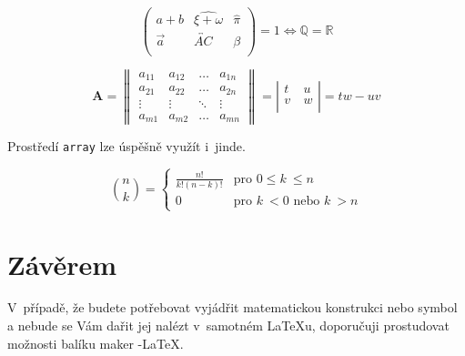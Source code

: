 \documentclass[a4paper, 11pt, twocolumn] {article}
\begin{document}
$$\left(
\begin{array}{ccc}
a + b & \widehat{\xi + \omega} & \hat{\pi}\\
\vec{a}  & \overleftrightarrow{AC} & \beta\\
\end{array} 
\right) = 1 \Longleftrightarrow \mathbb{Q} = \mathbb{R}
$$

$$
\mathbf{A} = 
\left\|
\begin{array}{cccc}
a_{11} & a_{12} & \dots & a_{1n}\\
a_{21} & a_{22} & \dots & a_{2n}\\
\vdots & \vdots & \ddots & \vdots\\
a_{m1} & a_{m2} & \dots & a_{mn}
\end{array}
\right\|= \left|
		   \begin{array}{lcr}
			t & u\\
			v~& w\\
			\end{array}
			\right|
			= tw -uv
			$$


\par Prostředí \texttt{array} lze úspěšně využít i~jinde.

$$
\binom{n}{k} =
\left\{
\begin{array}{ll}
\frac{n!}{k!(n - k)!} & \text{pro } 0 \leq k~\leq n\\
0 & \text{pro } k~< 0 \text{ nebo } k~> n
\end{array} \right.
$$

\section{Závěrem}

V~případě, že budete potřebovat vyjádřit matematickou konstrukci nebo symbol a nebude se Vám dařit jej nalézt v~samotném \LaTeX u, doporučuji prostudovat možnosti balíku maker \AmS -\LaTeX.
\end{document}

